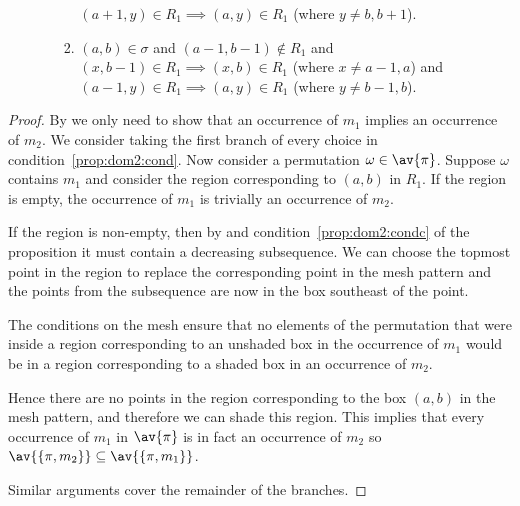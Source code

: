 \begin{proposition}
\begin{enumerate}
\begin{enumerate}
\begin{enumerate}
                                  \((a+1,y)\in R_1 \implies (a,y) \in R_1\) (where \(y\neq b,b+1\)).
                            \item \((a,b) \in \sigma\) and \((a-1,b-1)\notin R_1\) and \\
                                  \((x,b-1)\in R_1 \implies (x,b) \in R_1\) (where \(x\neq a-1,a\)) and\\
                                  \((a-1,y)\in R_1 \implies (a,y) \in R_1\)  (where \(y\neq b-1,b\)).
                        \end{enumerate}
                \end{enumerate}
    \end{enumerate}
\end{proposition}
\begin{proof}
    By  we only need to show that an occurrence of \(m_1\)
    implies an occurrence of \(m_2\).
    We consider taking the first branch of every choice in condition~\eqref{prop:dom2:cond}.
    Now consider a permutation \(\omega \in \av{\pi}\). Suppose
    \(\omega\) contains \(m_1\) and consider the region corresponding to
    \((a,b)\) in \(R_1\). If the region is empty, the occurrence of \(m_1\) is trivially an occurrence
    of \(m_2\).

    If the region is non-empty, then by  and
    condition~\eqref{prop:dom2:condc} of the proposition it must contain
    a decreasing subsequence.
    We can choose the topmost point in the region to replace the corresponding
    point in the mesh pattern and the points from the subsequence are now in
    the box southeast of the point.

    The conditions on the mesh ensure that no elements of the permutation
    that were inside a region corresponding to an unshaded box in the occurrence
    of \(m_1\) would be in a region corresponding to a shaded box in an occurrence of
    \(m_2\).

    Hence there are no
    points in the region corresponding to the box \((a,b)\) in the mesh
    pattern, and therefore we can shade this region. This implies that every
    occurrence of \(m_1\) in \(\av{\pi}\) is in fact an occurrence of \(m_2\)
    so \(\av{\{\pi,m_2\}} \subseteq \av{\{\pi,m_1\}}\).

    Similar arguments cover the remainder of the branches.
\end{proof}

